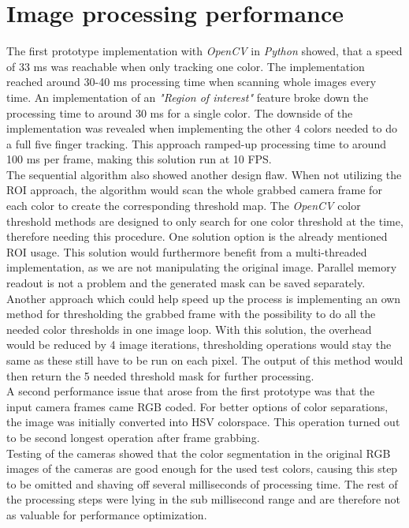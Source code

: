 \section{Image processing performance}
The first prototype implementation with \textit{OpenCV} in \textit{Python} showed, that a speed of  33 ms was reachable when only tracking one color. The implementation reached around 30-40 ms processing time when scanning whole images every time. An implementation of an \textit{"Region of interest"} feature  broke down the processing time to around 30 ms for a single color. The downside of the implementation was revealed when implementing the other 4 colors needed to do a full five finger tracking. This approach ramped-up processing time to around 100 ms per frame, making this solution run at 10 FPS.\\ 
The sequential algorithm also showed another design flaw. When not utilizing the ROI approach, the algorithm would scan the whole grabbed camera frame for each color to create the corresponding threshold map. The \textit{OpenCV} color threshold methods are designed to only search for one color threshold at the time, therefore needing this procedure. One solution option is the already mentioned ROI usage. This solution would furthermore benefit from a multi-threaded implementation, as we are not manipulating the original image. Parallel memory readout is not a problem and the generated mask can be saved separately.\\
Another approach which could help speed up the process is implementing an own method for thresholding the grabbed frame with the possibility to do all the needed color thresholds in one image loop. With this solution, the overhead would be reduced by 4 image iterations, thresholding operations would stay the same as these still have to be run on each pixel. The output of this method would then return the 5 needed threshold mask for further processing.\\
A second performance issue that arose from the first prototype was that the input camera frames came RGB coded. For better options of color separations, the image was initially converted into HSV colorspace. This operation turned out to be second longest operation after frame grabbing. \\Testing of the cameras showed that the color segmentation in the original RGB images of the cameras are good enough for the used test colors, causing this step to be omitted and shaving off several milliseconds of processing time.
The rest of the processing steps were lying in the sub millisecond range and are therefore not as valuable for performance optimization.
